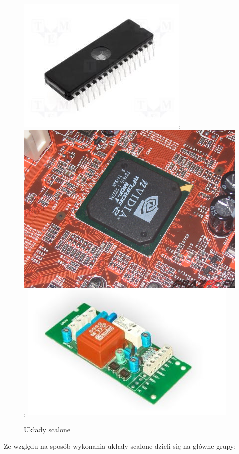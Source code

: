 \documentclass[a4paper,11pt]{article}
\begin{document}
\begin{figure}[!htb]
\centerline{
\includegraphics[scale=0.4]{source/uklad1.jpg}, \includegraphics[scale=0.4]{source/uklad2.jpg}, \includegraphics[scale=0.4]{source/uklad3.jpg}}
\caption{Układy scalone}
\label{fig:ukladyScalone}
\end{figure}
 
Ze względu na sposób wykonania układy scalone dzieli się na główne grupy:
\end{document}

